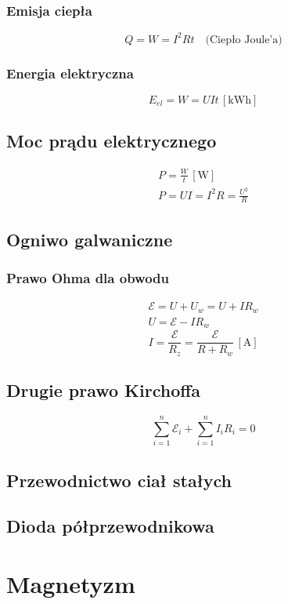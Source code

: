 \documentclass{article}
\numberwithin{equation}{section}
\newcommand{\unit}[1]{\, \left[\mathrm{#1}\right]}
\begin{document}
      \subsubsection{Emisja ciepła}
        \begin{equation}
          Q = W = I^2Rt \quad\text{(Ciepło Joule'a)}
        \end{equation}
      \subsubsection{Energia elektryczna}
        \begin{equation}
          E_{el} = W = UIt \unit{kWh}
        \end{equation}
    \subsection{Moc prądu elektrycznego}
      \begin{gather}
        P = \frac{W}{t} \unit{W}\\
        P = UI = I^2R = \frac{U^2}{R}
      \end{gather}
    \subsection{Ogniwo galwaniczne}
      \subsubsection{Prawo Ohma dla obwodu}
        \begin{gather}
          \mathcal E = U + U_w = U + IR_w\\
          U = \mathcal E - IR_w
        \end{gather}
        \begin{equation}
          I = \frac{\mathcal E}{R_z} = \frac{\mathcal E}{R + R_w} \unit{A}
        \end{equation}
    \subsection{Drugie prawo Kirchoffa}
      \begin{equation}
        \sum_{i=1}^n \mathcal E_i + \sum_{i=1}^n I_iR_i = 0
      \end{equation}
    \subsection{Przewodnictwo ciał stałych}
    \subsection{Dioda półprzewodnikowa}

  \newpage
  \section{Magnetyzm}
\end{document}
